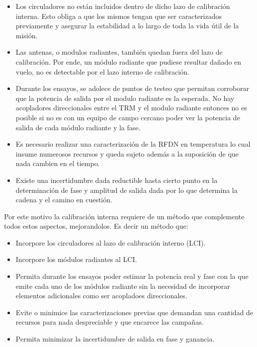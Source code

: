 \documentclass[a4paper,10pt]{article}
\begin{document}
\begin{itemize}
    \item Los circuladores no están incluidos dentro de dicho lazo de 
calibración interna. Esto obliga a que los mismos tengan que ser caracterizados
previamente y asegurar la estabilidad a lo largo de toda la vida útil de la
misión.
    \item Las antenas, o modulos radiantes, también quedan fuera del lazo de
calibración. Por ende, un módulo radiante que pudiese resultar dañado en vuelo,
no es detectable por el lazo interno de calibración.
    \item Durante los ensayos, se adolece de puntos de testeo que permitan 
corroborar que la potencia de salida por el modulo radiante es la esperada. No
hay acopladores direccionales entre el TRM y el modulo radiante entonces no es
posible si no es con un equipo de campo cercano poder ver la potencia de salida
de cada módulo radiante y la fase.
    \item Es necesario realizar una caracterización de la RFDN en temperatura lo
cual insume numerosos recursos y queda sujeto además a la suposición de que nada
cambien en el tiempo. 
    \item Existe una incertidumbre dada reductible hasta cierto punto en la 
determinación de fase y amplitud de salida dada por lo que determina la cadena y
el camino en cuestión.
\end{itemize}

Por este motivo la calibración interna requiere de un método que complemente 
todos estos aspectos, mejorandolos. Es decir un método que:

\begin{itemize}
    \item Incorpore los circuladores al lazo de calibración interno (LCI).
    \item Incorpore los módulos radiantes al LCI.
    \item Permita durante los ensayos poder estimar la potencia real y fase con
la que emite cada uno de los módulos radiante sin la necesidad de incorporar
elementos adicionales como ser acopladoes direccionales.
    \item Evite o minimice las caracterizaciones previas que demandan una
cantidad de recursos para nada despreciable y que encarece las campañas.
    \item Permita minimizar la incertidumbre de salida en fase y ganancia.
\end{itemize}
\end{document}
